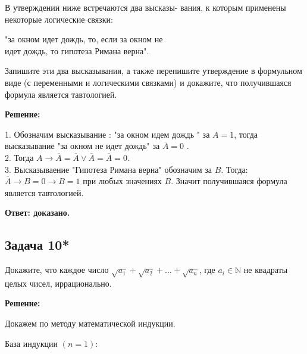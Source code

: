 \documentclass[a4paper,14pt]{article} %
\begin{document}
В утверждении ниже встречаются два высказы-
вания, к которым применены некоторые логические связки:
\begin{center}
"за окном идет дождь, то, если за окном не\\
идет дождь, то гипотеза Римана верна".
\end{center} 

Запишите эти два высказывания, а также перепишите утверждение в формульном виде (с переменными и логическими связками) и докажите, что получившаяся формула является тавтологией.

\begin{center}
\bfseries
{\Large Решение: }
\end{center}

1. Обозначим высказывание : "за окном идем дождь "\hspace{1mm} за $A = 1$, тогда высказывание "за окном не идет дождь"\hspace{1mm} за $\overline{A} = 0$ .\\
2. Тогда $A \rightarrow \overline{A} = \overline{A} \vee \overline{A} = \overline{A} = 0$.\\
3. Высказываение "Гипотеза Римана верна" обозначим за $B$. Тогда:\\
$\overline{A} \rightarrow B = 0 \rightarrow B = 1$ при любых значениях $B$. Значит получившаяся формула является тавтологией.




\begin{flushright}
\begin{large}
\textbf {Ответ: доказано. }
\end{large}
\end{flushright}

\begin{center}
\subsection{Задача 10*}
\end{center}

Докажите, что каждое число $\sqrt{a_{1}}+\sqrt{a_{2}}+\ldots+\sqrt{a_{n}}$, где $a_{i} \in \mathbb{N}$ не
квадраты целых чисел, иррационально.

\begin{center}
\bfseries
{\Large Решение: }
\end{center}


Докажем по методу математической индукции.

База индукции $(n = 1)$:
\end{document}
